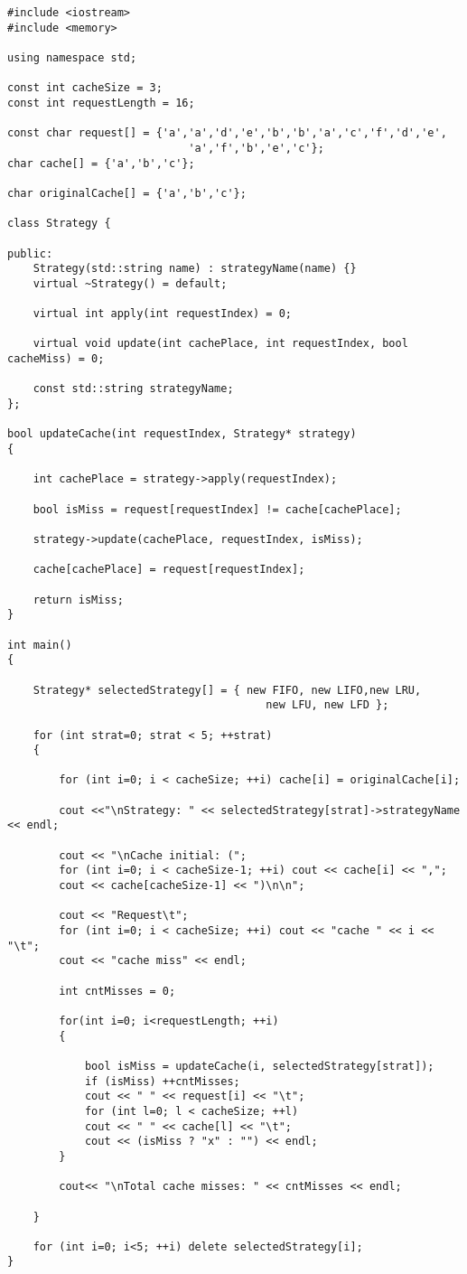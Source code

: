 \begin{tcolorbox}
\begin{verbatim}
#include <iostream>
#include <memory>

using namespace std;

const int cacheSize = 3;
const int requestLength = 16;

const char request[] = {'a','a','d','e','b','b','a','c','f','d','e',
							'a','f','b','e','c'};
char cache[] = {'a','b','c'}; 

char originalCache[] = {'a','b','c'};

class Strategy {

public:
	Strategy(std::string name) : strategyName(name) {}
	virtual ~Strategy() = default;
	
	virtual int apply(int requestIndex) = 0;
	
	virtual void update(int cachePlace, int requestIndex, bool cacheMiss) = 0;
	
	const std::string strategyName;
};

bool updateCache(int requestIndex, Strategy* strategy)
{
	
	int cachePlace = strategy->apply(requestIndex);
	
	bool isMiss = request[requestIndex] != cache[cachePlace];
	
	strategy->update(cachePlace, requestIndex, isMiss);
	
	cache[cachePlace] = request[requestIndex];
	
	return isMiss;
}

int main()
{
	
	Strategy* selectedStrategy[] = { new FIFO, new LIFO,new LRU, 
										new LFU, new LFD };
	
	for (int strat=0; strat < 5; ++strat)
	{
		
		for (int i=0; i < cacheSize; ++i) cache[i] = originalCache[i];
		
		cout <<"\nStrategy: " << selectedStrategy[strat]->strategyName << endl;
		
		cout << "\nCache initial: (";
		for (int i=0; i < cacheSize-1; ++i) cout << cache[i] << ",";
		cout << cache[cacheSize-1] << ")\n\n";
		
		cout << "Request\t";
		for (int i=0; i < cacheSize; ++i) cout << "cache " << i << "\t";
		cout << "cache miss" << endl;
		
		int cntMisses = 0;
		
		for(int i=0; i<requestLength; ++i)
		{
		
			bool isMiss = updateCache(i, selectedStrategy[strat]);
			if (isMiss) ++cntMisses;
			cout << " " << request[i] << "\t";
			for (int l=0; l < cacheSize; ++l) 
			cout << " " << cache[l] << "\t";
			cout << (isMiss ? "x" : "") << endl;
		}
		
		cout<< "\nTotal cache misses: " << cntMisses << endl;
		
	}
	
	for (int i=0; i<5; ++i) delete selectedStrategy[i];
}

\end{verbatim}
\end{tcolorbox}

